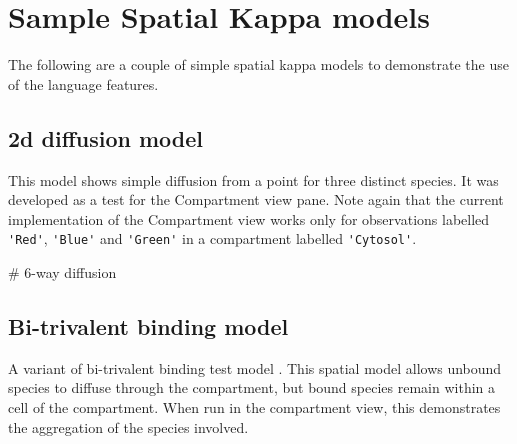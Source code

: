 \newpage
\section{Sample Spatial Kappa models}

The following are a couple of simple spatial kappa models to demonstrate the use of the language features.



\subsection{2d diffusion model}
\label{sec:2dDiffusion}

This model shows simple diffusion from a point for three distinct species. It was developed as a test for the Compartment view pane. Note again that the current implementation of the Compartment view works only for observations labelled \verb|'Red'|, \verb|'Blue'| and \verb|'Green'| in a compartment labelled \verb|'Cytosol'|.


\begin{kappasource}

# 6-way diffusion



\end{kappasource}


\subsection{Bi-trivalent binding model}
\label{sec:bitrivalent}


A variant of bi-trivalent binding test model \citep{yang2008kinetic}. This spatial model allows unbound species to diffuse through the compartment, but bound species remain within a cell of the compartment. When run in the compartment view, this demonstrates the aggregation of the species involved.


